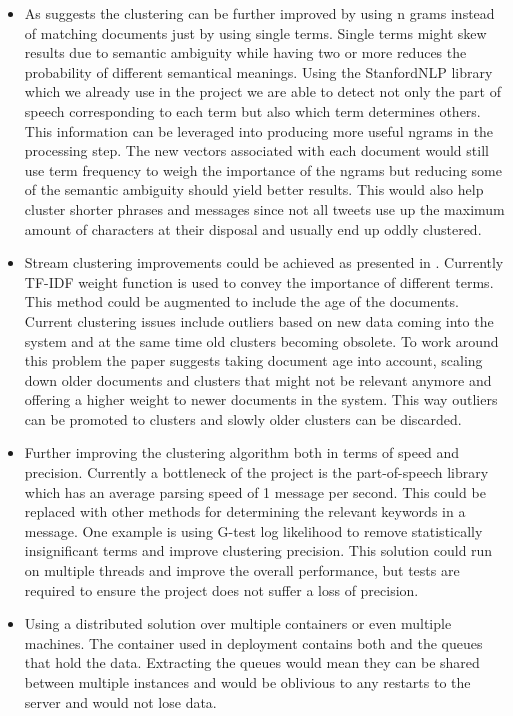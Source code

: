 \begin{itemize}
	\item As \cite{clusteralgos} suggests the clustering can be further improved by using n grams instead of matching documents just by using single terms. Single terms might skew results due to semantic ambiguity while having two or more reduces the probability of different semantical meanings. Using the StanfordNLP library which we already use in the project we are able to detect not only the part of speech corresponding to each term but also which term determines others. This information can be leveraged into producing more useful ngrams in the processing step. The new vectors associated with each document would still use term frequency to weigh the importance of the ngrams but reducing some of the semantic ambiguity should yield better results. This would also help cluster shorter phrases and messages since not all tweets use up the maximum amount of characters at their disposal and usually end up oddly clustered.
	\item Stream clustering improvements could be achieved as presented in \cite{clusteralgos}. Currently TF-IDF weight function is used to convey the importance of different terms. This method could be augmented to include the age of the documents. Current clustering issues include outliers based on new data coming into the system and at the same time old clusters becoming obsolete. To work around this problem the paper suggests taking document age into account, scaling down older documents and clusters that might not be relevant anymore and offering a higher weight to newer documents in the system. This way outliers can be promoted to clusters and slowly older clusters can be discarded.
	\item Further improving the clustering algorithm both in terms of speed and precision. Currently a bottleneck of the project is the part-of-speech library which has an average parsing speed of 1 message per second. This could be replaced with other methods for determining the relevant keywords in a message. One example is using G-test log likelihood to remove statistically insignificant terms and improve clustering precision. This solution could run on multiple threads and improve the overall performance, but tests are required to ensure the project does not suffer a loss of precision.
	\item Using a distributed solution over multiple containers or even multiple machines. The container used in deployment contains both {\project}  and the queues that hold the data. Extracting the queues would mean they can be shared between multiple instances and would be oblivious to any restarts to the server and would not lose data.

\end{itemize}

